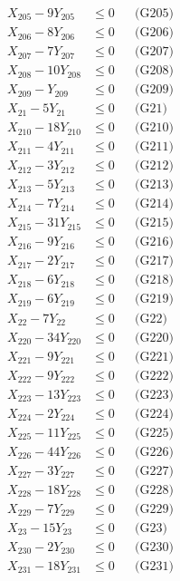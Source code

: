\documentclass[a4paper,10pt]{article}
\begin{document}
{\begin{align}
X_{205} - 9Y_{205} &\leq 0 && \text{(G205)} \\
\allowbreak
X_{206} - 8Y_{206} &\leq 0 && \text{(G206)} \\
X_{207} - 7Y_{207} &\leq 0 && \text{(G207)} \\
X_{208} - 10Y_{208} &\leq 0 && \text{(G208)} \\
X_{209} - Y_{209} &\leq 0 && \text{(G209)} \\
X_{21} - 5Y_{21} &\leq 0 && \text{(G21)} \\
X_{210} - 18Y_{210} &\leq 0 && \text{(G210)} \\
X_{211} - 4Y_{211} &\leq 0 && \text{(G211)} \\
X_{212} - 3Y_{212} &\leq 0 && \text{(G212)} \\
X_{213} - 5Y_{213} &\leq 0 && \text{(G213)} \\
X_{214} - 7Y_{214} &\leq 0 && \text{(G214)} \\
X_{215} - 31Y_{215} &\leq 0 && \text{(G215)} \\
X_{216} - 9Y_{216} &\leq 0 && \text{(G216)} \\
X_{217} - 2Y_{217} &\leq 0 && \text{(G217)} \\
X_{218} - 6Y_{218} &\leq 0 && \text{(G218)} \\
X_{219} - 6Y_{219} &\leq 0 && \text{(G219)} \\
X_{22} - 7Y_{22} &\leq 0 && \text{(G22)} \\
X_{220} - 34Y_{220} &\leq 0 && \text{(G220)} \\
X_{221} - 9Y_{221} &\leq 0 && \text{(G221)} \\
X_{222} - 9Y_{222} &\leq 0 && \text{(G222)} \\
X_{223} - 13Y_{223} &\leq 0 && \text{(G223)} \\
\allowbreak
X_{224} - 2Y_{224} &\leq 0 && \text{(G224)} \\
X_{225} - 11Y_{225} &\leq 0 && \text{(G225)} \\
X_{226} - 44Y_{226} &\leq 0 && \text{(G226)} \\
X_{227} - 3Y_{227} &\leq 0 && \text{(G227)} \\
X_{228} - 18Y_{228} &\leq 0 && \text{(G228)} \\
X_{229} - 7Y_{229} &\leq 0 && \text{(G229)} \\
X_{23} - 15Y_{23} &\leq 0 && \text{(G23)} \\
X_{230} - 2Y_{230} &\leq 0 && \text{(G230)} \\
X_{231} - 18Y_{231} &\leq 0 && \text{(G231)} \\

\end{align}}
\end{document}
